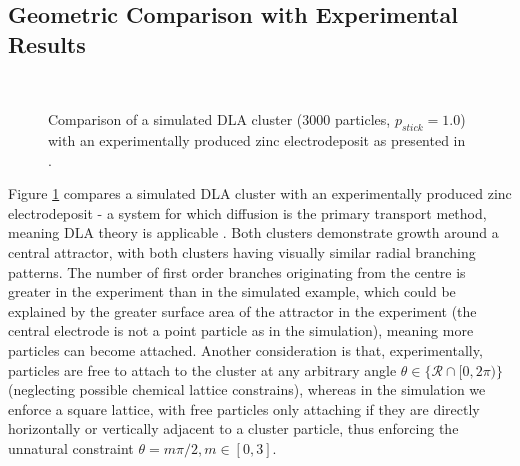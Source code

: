 \documentclass[11pt]{iopart}
\begin{document}
\subsection{Geometric Comparison with Experimental Results}

\begin{figure}[t]
    \centering
    \quad
     \\
 
    \caption{Comparison of a simulated DLA cluster (3000 particles, $p_{stick} = 1.0$) with an experimentally produced zinc electrodeposit as presented in \cite{dla}.}
    \label{fig:realcrystal}
\end{figure}

Figure \ref{fig:realcrystal} compares a simulated DLA cluster with an experimentally produced zinc electrodeposit - a system for which diffusion is the primary transport method, meaning DLA theory is applicable \cite{dla}. Both clusters demonstrate growth around a central attractor, with both clusters having visually similar radial branching patterns. The number of first order branches originating from the centre is greater in the experiment than in the simulated example, which could be explained by the greater surface area of the attractor in the experiment (the central electrode is not a point particle as in the simulation), meaning more particles can become attached. Another consideration is that, experimentally, particles are free to attach to the cluster at any arbitrary angle $\theta \in \{\mathcal{R} \cap [0, 2\pi) \}$ (neglecting possible chemical lattice constrains), whereas in the simulation we enforce a square lattice, with free particles only attaching if they are directly horizontally or vertically adjacent to a cluster particle, thus enforcing the unnatural constraint $\theta = m\pi/2, m \in [0,3]$.
\end{document}
